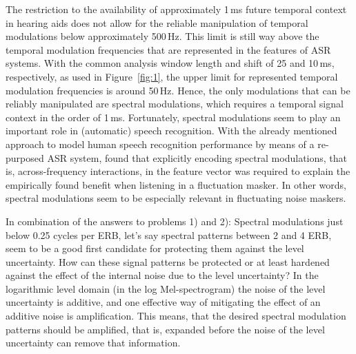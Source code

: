 \documentclass[10pt,a4paper,twocolumn]{article}
\begin{document}
The restriction to the availability of approximately 1\,ms future temporal context in hearing aids does not allow for the reliable  manipulation of temporal modulations below approximately 500\,Hz.
%
This limit is still way above the temporal modulation frequencies that are represented in the features of ASR systems.
%
With the common analysis window length and shift of 25 and 10\,ms, respectively, as used in Figure~\ref{fig:1}, the upper limit for represented temporal modulation frequencies is around 50\,Hz.
%
Hence, the only modulations that can be reliably manipulated are spectral modulations, which requires a temporal signal context in the order of 1\,ms.
%
Fortunately, spectral modulations seem to play an important role in (automatic) speech recognition.
%
With the already mentioned approach to model human speech recognition performance by means of a re-purposed ASR system, \cite{schaedler2016a} found that explicitly encoding spectral modulations, that is, across-frequency interactions, in the feature vector was required to explain the empirically found benefit when listening in a fluctuation masker.
%
In other words, spectral modulations seem to be especially relevant in fluctuating noise maskers.

In combination of the answers to problems 1) and 2): Spectral modulations just below 0.25 cycles per ERB, let's say spectral patterns between 2 and 4 ERB, seem to be a good first candidate for protecting them against the level uncertainty.
%
How can these signal patterns be protected or at least hardened against the effect of the internal noise due to the level uncertainty?
%
In the logarithmic level domain (in the log Mel-spectrogram) the noise of the level uncertainty is additive, and one effective way of mitigating the effect of an additive noise is amplification.
%
This means, that the desired spectral modulation patterns should be amplified, that is, expanded before the noise of the level uncertainty can remove that information.
\end{document}
